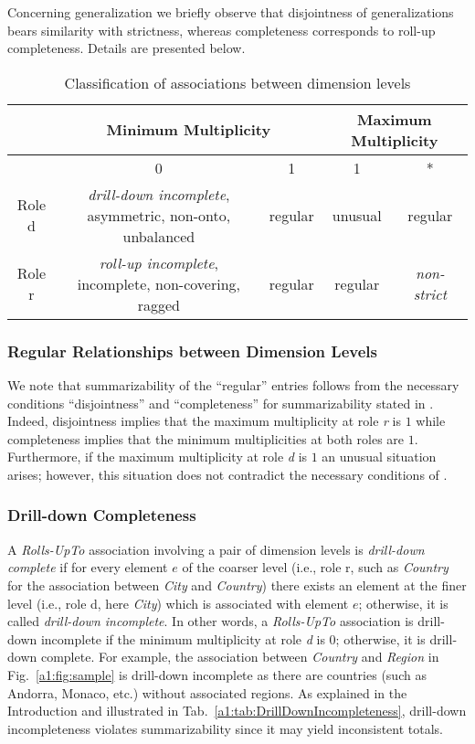 Concerning generalization we briefly observe that disjointness of
generalizations bears similarity with strictness, whereas
completeness corresponds to roll-up completeness.  Details are
presented below.

\begin{table}
  \centering
  \caption{Classification of associations between dimension levels}
  \label{a1:tab:multiplicity-classification}
    \begin{tabular}{|c||c|c|c|c|}
         \hline
       & \multicolumn{2}{|c|}{Minimum Multiplicity} & \multicolumn{2}{|c|}{Maximum Multiplicity} \\\hline
       & 0 & 1 & 1 & * \\\hline
      Role d & \emph{drill-down incomplete}, asymmetric, non-onto, unbalanced & regular & unusual & regular \\
      Role r & \emph{roll-up incomplete}, incomplete, non-covering, ragged & regular & regular & \emph{non-strict} \\\hline
    \end{tabular}
\end{table}

\subsubsection{Regular Relationships between Dimension Levels} We
note that summarizability of the ``regular'' entries follows from
the necessary conditions ``disjointness'' and ``completeness'' for
summarizability stated in \cite{DBLP:conf/ssdbm/LenzS97}. Indeed,
disjointness implies that the maximum multiplicity at role \emph{r}
is $1$ while completeness implies that the minimum multiplicities at
both roles are $1$.  Furthermore, if the maximum multiplicity at
role \emph{d} is $1$ an unusual situation arises; however, this
situation does not contradict the necessary conditions of
\cite{DBLP:conf/ssdbm/LenzS97}.

\subsubsection{Drill-down Completeness}
A \emph{Rolls-UpTo} association involving a pair of dimension levels
is \emph{drill-down complete} if for every element $e$ of the
coarser level (i.e., role r, such as \textit{Country} for the
association between \textit{City} and \textit{Country}) there exists
an element at the finer level (i.e., role d, here \textit{City})
which is associated with element $e$; otherwise, it is called
\emph{drill-down incomplete}.  In other words, a \emph{Rolls-UpTo}
association is drill-down incomplete if the minimum multiplicity at
role \emph{d} is $0$; otherwise, it is drill-down complete.  For
example, the association between \textit{Country} and
\textit{Region} in Fig.~\ref{a1:fig:sample} is drill-down incomplete
as there are countries (such as Andorra, Monaco, etc.)  without
associated regions.  As explained in the Introduction and
illustrated in Tab.~\ref{a1:tab:DrillDownIncompleteness}, drill-down
incompleteness violates summarizability since it may yield
inconsistent totals.

